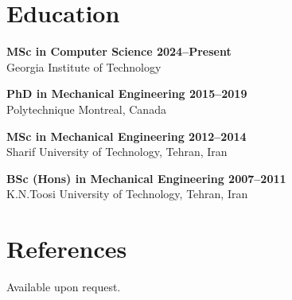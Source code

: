 \documentclass[11pt,a4paper]{article}
\begin{document}
\section*{Education}

\textbf{MSc in Computer Science \hfill 2024--Present} \\
Georgia Institute of Technology

\textbf{PhD in Mechanical Engineering \hfill 2015--2019} \\
Polytechnique Montreal, Canada

\textbf{MSc in Mechanical Engineering \hfill 2012--2014} \\
Sharif University of Technology, Tehran, Iran

\textbf{BSc (Hons) in Mechanical Engineering \hfill 2007--2011} \\
K.N.Toosi University of Technology, Tehran, Iran

\section*{References}
Available upon request.
\end{document}
